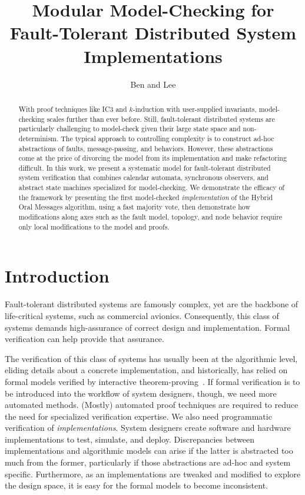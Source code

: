 \documentclass{llncs/llncs}
\newcommand{\lee}[1]{ } %
\newcommand{\lee}[1]{ {\color{blue}$<$lee: #1$>$} } %
\begin{document}
\title{Modular Model-Checking for Fault-Tolerant Distributed System Implementations}
\author{Ben and Lee}


\maketitle


\begin{abstract}
With proof techniques like IC3 and $k$-induction with user-supplied
invariants, model-checking scales further than ever before.  Still,
fault-tolerant distributed systems are particularly challenging to
model-check given their large state space and non-determinism. The
typical approach to controlling complexity is to construct ad-hoc
abstractions of faults, message-passing, and behaviors.  However,
these abstractions come at the price of divorcing the model from its
implementation and make refactoring difficult. In this work, we
present a systematic model for fault-tolerant distributed system
verification that combines calendar automata, synchronous observers,
and abstract state machines specialized for model-checking. We
demonstrate the efficacy of the framework by presenting the first
model-checked \emph{implementation} of the Hybrid Oral Messages
algorithm, using a fast majority vote, then demonstrate how
modifications along axes such as the fault model, topology, and node
behavior require only local modifications to the model and proofs.
\end{abstract}

\section{Introduction}

\lee{talk about Amazon/TLA? Paxos made live?}

Fault-tolerant distributed systems are famously complex, yet are the backbone of life-critical systems, such as commercial avionics. Consequently, this class of systems demands high-assurance of correct design and implementation. Formal verification can help provide that assurance.

The verification of this class of systems has usually been at the algorithmic level, eliding details about a concrete implementation, and historically, has relied on formal models verified by interactive theorem-proving~\cite{om-acl2-impl,Young97:IC,csl-93-2,pvs}. If formal verification is to be introduced into the workflow of system designers, though, we need more automated methods. (Mostly) automated proof techniques are required to reduce the need for specialized verification expertise. We also need programmatic verification of \emph{implementations}. System designers create software and hardware implementations to test, simulate, and deploy. Discrepancies between implementations and algorithmic models can arise if the latter is abstracted too much from the former, particularly if those abstractions are ad-hoc and system specific. Furthermore, as an implementations are tweaked and modified to explore the design space, it is easy for the formal models to become inconsistent.
\end{document}
